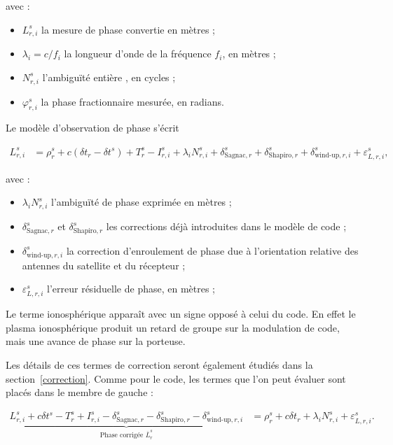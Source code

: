 avec :

\begin{itemize}
    \item $L_{r,i}^s$ la mesure de phase convertie en mètres ;
    \item $\lambda_i=c/f_i$ la longueur d'onde de la fréquence $f_i$, en
    mètres ;
    \item $N_{r,i}^s$ l'ambiguïté entière , en cycles ;
    \item $\varphi_{r,i}^s$ la phase fractionnaire mesurée, en radians.
\end{itemize}

Le modèle d'observation de phase s'écrit~\cite[p.~591]{capderou2012}

\begin{align}
L_{r,i}^s
&=
\rho_r^s
+c\left(\delta t_r-\delta t^s\right)
+T_r^s
-I_{r,i}^s
+\lambda_i N_{r,i}^s
+\delta_{\mathrm{Sagnac},r}^s
+\delta_{\mathrm{Shapiro},r}^s
+\delta_{\mathrm{wind\text{-}up},r,i}^s
+\varepsilon_{L,r,i}^s,
\label{eq:phase}
\end{align}

avec :

\begin{itemize}
    \item $\lambda_i N_{r,i}^s$ l'ambiguïté de phase exprimée en mètres ;
    \item $\delta_{\mathrm{Sagnac},r}^s$ et
    $\delta_{\mathrm{Shapiro},r}^s$ les corrections déjà introduites dans le
    modèle de code ;
    \item $\delta_{\mathrm{wind\text{-}up},r,i}^s$ la correction
    d'enroulement de phase due à l'orientation relative des antennes du
    satellite et du récepteur ;
    \item $\varepsilon_{L,r,i}^s$ l'erreur résiduelle de phase, en mètres ;
\end{itemize}

Le terme ionosphérique apparaît avec un signe opposé à celui du code. En effet le plasma
ionosphérique produit un retard de groupe sur la modulation de code, mais une
avance de phase sur la porteuse. 

Les détails de ces termes de correction seront également étudiés dans la
section~\ref{correction}. Comme pour le code, les termes que l'on peut évaluer
sont placés dans le membre de gauche :

\begin{align}
\underbrace{
L_{r,i}^s
+c\delta t^s
-T_r^s
+I_{r,i}^s
-\delta_{\mathrm{Sagnac},r}^s
-\delta_{\mathrm{Shapiro},r}^s
-\delta_{\mathrm{wind\text{-}up},r,i}^s
}_{\text{Phase corrigée }\overline L_r^s}
&=
\rho_r^s+c\delta t_r+\lambda_i N_{r,i}^s+\varepsilon_{L,r,i}^s.
\label{eq:phase_corrigee}
\end{align}

